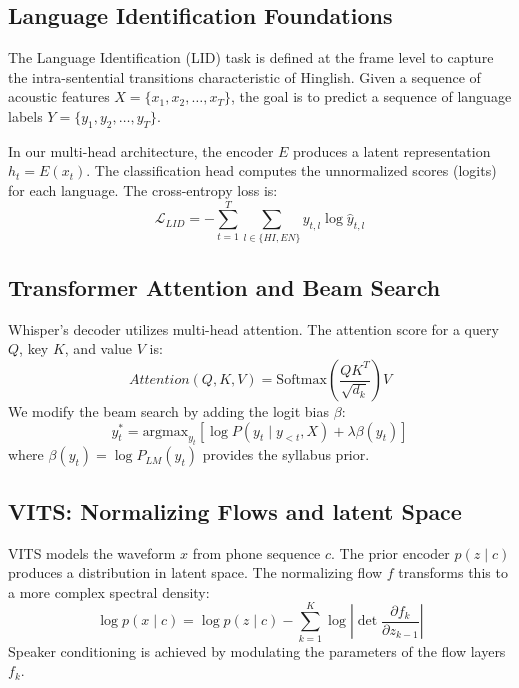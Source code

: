 \documentclass[10pt,twocolumn,letterpaper]{article}
\begin{document}
\subsection{Language Identification Foundations}
The Language Identification (LID) task is defined at the frame level to
capture the intra-sentential transitions characteristic of Hinglish.
Given a sequence of acoustic features $X = \{x_1, x_2, \dots, x_T\}$,
the goal is to predict a sequence of language labels $Y = \{y_1, y_2, \dots, y_T\}$.

In our multi-head architecture, the encoder $E$ produces a latent
representation $h_t = E(x_t)$. The classification head computes the
unnormalized scores (logits) for each language. The cross-entropy loss is:
\begin{equation}
\mathcal{L}_{LID} = -\sum_{t=1}^T \sum_{l \in \{HI, EN\}} y_{t,l} \log \hat{y}_{t,l}
\end{equation}

\subsection{Transformer Attention and Beam Search}
Whisper's decoder utilizes multi-head attention. The attention score
for a query $Q$, key $K$, and value $V$ is:
\begin{equation}
Attention(Q, K, V) = \text{Softmax}\left(\frac{QK^T}{\sqrt{d_k}}\right)V
\end{equation}
We modify the beam search by adding the logit bias $\beta$:
\begin{equation}
y_t^* = \text{argmax}_{y_t} [ \log P(y_t \mid y_{<t}, X) + \lambda \beta(y_t) ]
\end{equation}
where $\beta(y_t) = \log P_{LM}(y_t)$ provides the syllabus prior.

\subsection{VITS: Normalizing Flows and latent Space}
VITS models the waveform $x$ from phone sequence $c$. The prior encoder
$p(z \mid c)$ produces a distribution in latent space. The normalizing
flow $f$ transforms this to a more complex spectral density:
\begin{equation}
\log p(x \mid c) = \log p(z \mid c) - \sum_{k=1}^K \log \left| \det \frac{\partial f_k}{\partial z_{k-1}} \right|
\end{equation}
Speaker conditioning is achieved by modulating the parameters of the
flow layers $f_k$.
\end{document}
